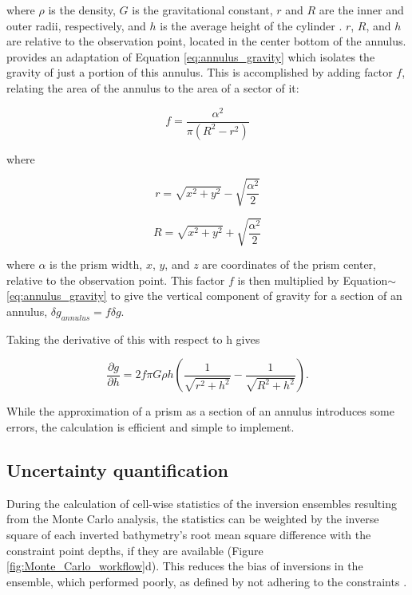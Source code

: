 \documentclass[tc, manuscript]{copernicus}
\begin{document}
\noindent
where $\rho$ is the density, $G$ is the gravitational constant, $r$ and $R$ are the inner and outer radii, respectively, and $h$ is the average height of the cylinder \citep{hammerterrain1939}. $r$, $R$, and $h$ are relative to the observation point, located in the center bottom of the annulus. \citet{mccubbineairborne2016} provides an adaptation of Equation \ref{eq:annulus_gravity} which isolates the gravity of just a portion of this annulus. This is accomplished by adding factor $f$, relating the area of the annulus to the area of a sector of it:

\begin{equation}
f = \frac{\alpha^2}{\pi(R^2 - r^2)}
\end{equation}

\noindent
where

\begin{equation}
r = \sqrt{x^2+y^2} - \sqrt{\frac{\alpha^2}{2}}
\end{equation}

\begin{equation}
R = \sqrt{x^2+y^2} + \sqrt{\frac{\alpha^2}{2}}
\end{equation}

\noindent
where $\alpha$ is the prism width, $x$, $y$, and $z$ are coordinates of the prism center, relative to the observation point. This factor $f$ is then multiplied by Equation$\sim$\ref{eq:annulus_gravity} to give the vertical component of gravity for a section of an annulus, $\delta g_{annulus} = f \delta g$.

Taking the derivative of this with respect to h gives

\begin{equation} \label{eq:vertical_derivative_annulus}
\dfrac{\partial g}{\partial h} = 2 f \pi G \rho h (
    \dfrac{1}{\sqrt{r^2 + h^2}} - \dfrac{1}{\sqrt{R^2 + h^2}} ).
\end{equation}

While the approximation of a prism as a section of an annulus introduces some errors, the calculation is efficient and simple to implement.

\subsection{Uncertainty quantification}\label{app:uncertainties}
During the calculation of cell-wise statistics of the inversion ensembles resulting from the Monte Carlo analysis, the statistics can be weighted by the inverse square of each inverted bathymetry's root mean square difference with the constraint point depths, if they are available (Figure \ref{fig:Monte_Carlo_workflow}d). This reduces the bias of inversions in the ensemble, which performed poorly, as defined by not adhering to the constraints \citep{schnaidtbootstrap2015}.
\end{document}

